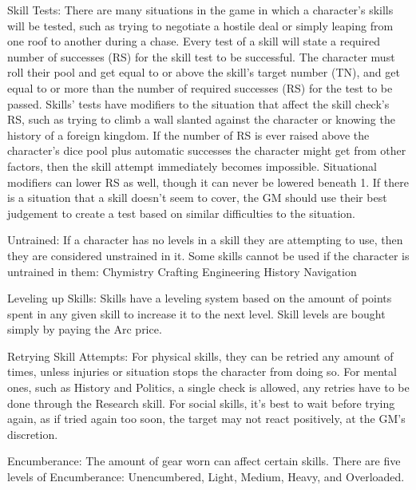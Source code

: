 \documentclass[oneside,11pt,english]{book}
\begin{document}
 

Skill Tests: There are many situations in the game in which a character’s skills will be tested, such as 
trying to negotiate a hostile deal or simply leaping from one roof to another during a chase. Every test of a 
skill will state a required number of successes (RS) for the skill test to be successful. The character must 
roll their pool and get equal to or above the skill’s target number (TN), and get equal to or more than the 
number of required successes (RS) for the test to be passed. Skills’ tests have modifiers to the situation 
that affect the skill check’s RS, such as trying to climb a wall slanted against the character or knowing the 
history of a foreign kingdom. If the number of RS is ever raised above the character’s dice pool plus 
automatic successes the character might get from other factors, then the skill attempt immediately 
becomes impossible. Situational modifiers can lower RS as well, though it can never be lowered beneath 
1. If there is a situation that a skill doesn’t seem to cover, the GM should use their best judgement to 
create a test based on similar difficulties to the situation. 

 

Untrained: If a character has no levels in a skill they are attempting to use, then they are considered 
unstrained in it. Some skills cannot be used if the character is untrained in them: 
Chymistry 
Crafting 
Engineering 
History 
Navigation 


 

 

Leveling up Skills: Skills have a leveling system based on the amount of points spent in any given skill 
to increase it to the next level. Skill levels are bought simply by paying the Arc price. 

 

Retrying Skill Attempts: For physical skills, they can be retried any amount of times, unless injuries or 
situation stops the character from doing so. For mental ones, such as History and Politics, a single check 
is allowed, any retries have to be done through the Research skill. For social skills, it’s best to wait 
before trying again, as if tried again too soon, the target may not react positively, at the GM’s discretion. 

 

Encumberance: The amount of gear worn can affect certain skills. There are five levels of 
Encumberance: Unencumbered, Light, Medium, Heavy, and Overloaded. 
\end{document}
